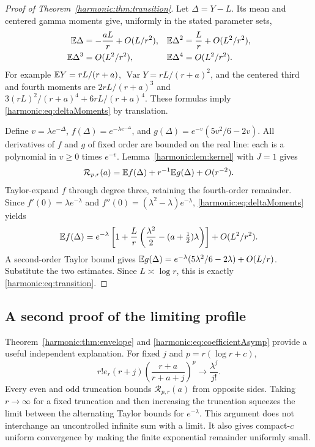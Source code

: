 \begin{proof}[Proof of Theorem~\ref{harmonic:thm:transition}]
Let $\Delta=Y-L$. Its mean and centered gamma moments give, uniformly in the stated parameter sets,
\begin{align}\label{harmonic:eq:deltaMoments}
 \mathbb E\Delta&=-\frac{aL}{r}+O(L/r^2),&
 \mathbb E\Delta^2&=\frac Lr+O(L^2/r^2),\\
 \mathbb E\Delta^3&=O(L^2/r^2),&
 \mathbb E\Delta^4&=O(L^2/r^2).\notag
\end{align}
For example $\mathbb E Y=rL/(r+a)$, $\operatorname{Var}Y=rL/(r+a)^2$, and the centered third and fourth moments are $2rL/(r+a)^3$ and $3(rL)^2/(r+a)^4+6rL/(r+a)^4$. These formulas imply \eqref{harmonic:eq:deltaMoments} by translation.

Define $v=\lambda e^{-\Delta}$,
$f(\Delta)=e^{-\lambda e^{-\Delta}}$, and
$g(\Delta)=e^{-v}(5v^2/6-2v)$. All derivatives of $f$ and $g$ of fixed order are bounded on the real line: each is a polynomial in $v\ge0$ times $e^{-v}$. Lemma~\ref{harmonic:lem:kernel} with $J=1$ gives
\[
 \mathcal R_{p,r}(a)=\mathbb E f(\Delta)+r^{-1}\mathbb E g(\Delta)+O(r^{-2}).
\]
Taylor-expand $f$ through degree three, retaining the fourth-order remainder. Since
$f'(0)=\lambda e^{-\lambda}$ and
$f''(0)=(\lambda^2-\lambda)e^{-\lambda}$, \eqref{harmonic:eq:deltaMoments} yields
\[
 \mathbb E f(\Delta)=e^{-\lambda}
 \left[1+\frac Lr\left(\frac{\lambda^2}{2}-(a+\tfrac12)\lambda\right)\right]
 +O(L^2/r^2).
\]
A second-order Taylor bound gives
$\mathbb E g(\Delta)=e^{-\lambda}(5\lambda^2/6-2\lambda)+O(L/r)$.
Substitute the two estimates. Since $L\asymp\log r$, this is exactly \eqref{harmonic:eq:transition}.
\end{proof}

\subsection{A second proof of the limiting profile}
Theorem~\ref{harmonic:thm:envelope} and \eqref{harmonic:eq:coefficientAsymp} provide a useful independent explanation. For fixed $j$ and $p=r(\log r+c)$,
\[
 r!e_r(r+j)\left(\frac{r+a}{r+a+j}\right)^p
 \longrightarrow\frac{\lambda^j}{j!}.
\]
Every even and odd truncation bounds $\mathcal R_{p,r}(a)$ from opposite sides. Taking $r\to\infty$ for a fixed truncation and then increasing the truncation squeezes the limit between the alternating Taylor bounds for $e^{-\lambda}$. This argument does not interchange an uncontrolled infinite sum with a limit. It also gives compact-$c$ uniform convergence by making the finite exponential remainder uniformly small.

